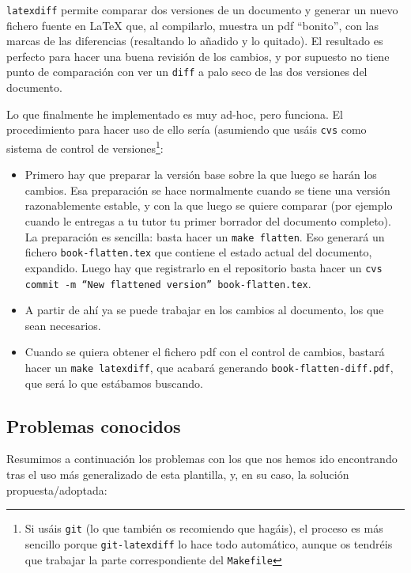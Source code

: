 \texttt{latexdiff} permite comparar dos versiones de un documento y
generar un nuevo fichero fuente en \LaTeX{} que, al compilarlo, muestra un
pdf ``bonito'', con las marcas de las diferencias (resaltando lo añadido
y lo quitado). El resultado es perfecto para hacer una buena revisión de
los cambios, y por supuesto no tiene punto de comparación con ver un
\texttt{diff} a palo seco de las dos versiones del documento. 

Lo que finalmente he implementado es muy ad-hoc, pero funciona. El
procedimiento para hacer uso de ello sería (asumiendo que usáis
\texttt{cvs} como sistema de control de versiones\footnote{Si usáis
  \texttt{git} (lo que también os recomiendo que hagáis), el proceso es
  más sencillo porque \texttt{git-latexdiff} lo hace todo automático,
  aunque os tendréis que trabajar la parte correspondiente del
  \texttt{Makefile}}:

\begin{itemize}
\item Primero hay que preparar la versión base sobre la que luego se
  harán los cambios. Esa preparación se hace normalmente cuando se tiene
  una versión razonablemente estable, y con la que luego se quiere
  comparar (por ejemplo cuando le entregas a tu tutor tu primer borrador
  del documento completo). La preparación es sencilla: basta hacer un
  \texttt{make flatten}. Eso generará un fichero
  \texttt{book-flatten.tex} que contiene el estado actual del documento,
  expandido. Luego hay que registrarlo en el repositorio basta hacer un
  \texttt{cvs commit -m ``New flattened version'' book-flatten.tex}.
\item A partir de ahí ya se puede trabajar en los cambios al documento,
  los que sean necesarios.
\item Cuando se quiera obtener el fichero pdf con el control de cambios,
  bastará hacer un \texttt{make latexdiff}, que acabará generando
  \texttt{book-flatten-diff.pdf}, que será lo que estábamos buscando.
\end{itemize}



\subsection{Problemas conocidos}
\label{sec:problemas-conocidos}

Resumimos a continuación los problemas con los que nos hemos ido
encontrando tras el uso más generalizado de esta plantilla, y, en su
caso, la solución propuesta/adoptada:

